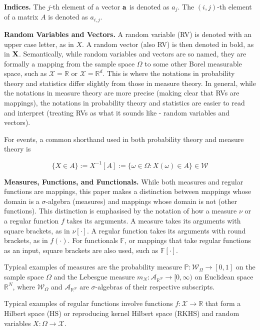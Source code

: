 \documentclass[twoside]{article} \usepackage{aistats2017}
\theoremstyle{definition}
\newcommand{\rv}[1]{{#1}}
\begin{document}
	\textbf{Indices.} The $j$-th element of a vector $\mathbf{a}$ is denoted as $a_{j}$. The $(i, j)$-th element of a matrix $A$ is denoted as $a_{i, j}$.
	
	\textbf{Random Variables and Vectors.} A random variable (RV) is denoted with an upper case letter, as in $\rv{X}$. A random vector (also RV) is then denoted in bold, as in $\bvec{\rv{X}}$. Semantically, while random variables and vectors are so named, they are formally a mapping from the sample space $\Omega$ to some other Borel measurable space, such as $\mathcal{X} = \mathbb{R}$ or $\mathcal{X} = \mathbb{R}^{d}$. This is where the notations in probability theory and statistics differ slightly from those in measure theory. In general, while the notations in measure theory are more precise (making clear that RVs are mappings), the notations in probability theory and statistics are easier to read and interpret (treating RVs as what it sounds like - random variables and vectors).
	
	For events, a common shorthand used in both probability theory and measure theory is
	
	\begin{equation}
		\{\rv{X} \in A\} := \rv{X}^{-1}[A] := \{\omega \in \Omega : \rv{X}(\omega) \in A\} \in \mathcal{W}
	\end{equation}
	
	\textbf{Measures, Functions, and Functionals.} While both measures and regular functions are mappings, this paper makes a distinction between mappings whose domain is a $\sigma$-algebra (measures) and mappings whose domain is not (other functions). This distinction is emphasised by the notation of how a measure $\nu$ or a regular function $f$ takes its arguments. A measure takes its arguments with square brackets, as in $\nu[\cdot]$. A regular function takes its arguments with round brackets, as in $f(\cdot)$. For functionals $\mathbb{F}$, or mappings that take regular functions as an input, square brackets are also used, such as $\mathbb{F}[\cdot]$.
	
	Typical examples of measures are the probability measure $\mathbb{P} : \mathcal{W}_{\Omega} \to [0, 1]$ on the sample space $\Omega$ and the Lebesgue measure $m_{N} : \mathcal{A}_{\mathbb{R}^{N}} \to [0, \infty)$ on Euclidean space $\mathbb{R}^{N}$, where $\mathcal{W}_{\Omega}$ and $\mathcal{A}_{\mathbb{R}^{N}}$ are $\sigma$-algebras of their respective subscripts.
	
	Typical examples of regular functions involve functions $f : \mathcal{X} \to \mathbb{R}$ that form a Hilbert space (HS) or reproducing kernel Hilbert space (RKHS) and random variables $\rv{X} : \Omega \to \mathcal{X}$.
	
\end{document}
